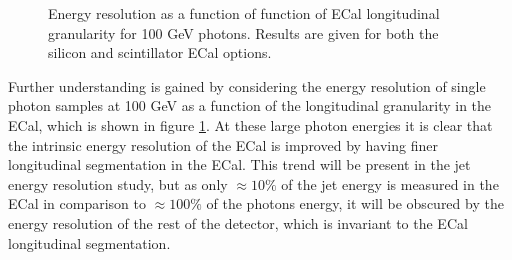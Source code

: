 \begin{figure}
\centering
{}
\caption[Energy resolution as a function of ECal longitudinal granularity for 100 GeV photons.  Results are given for both the silicon and scintillator ECal options.]{Energy resolution as a function of function of ECal longitudinal granularity for 100 GeV photons.  Results are given for both the silicon and scintillator ECal options.}
\label{fig:ecalnlayersgamma}
\end{figure}

Further understanding is gained by considering the energy resolution of single photon samples at 100 GeV as a function of the longitudinal granularity in the ECal, which is shown in figure \ref{fig:ecalnlayersgamma}.  At these large photon energies it is clear that the intrinsic energy resolution of the ECal is improved by having finer longitudinal segmentation in the ECal.  This trend will be present in the jet energy resolution study, but as only $\approx 10\%$ of the jet energy is measured in the ECal in comparison to $\approx 100\%$ of the photons energy, it will be obscured by the energy resolution of the rest of the detector, which is invariant to the ECal longitudinal segmentation.    

